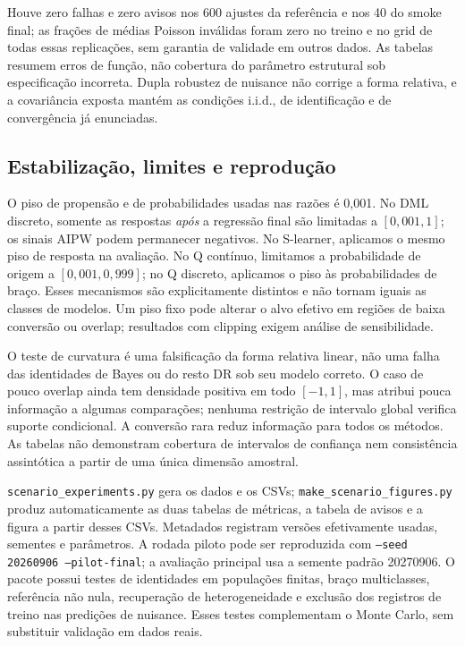 Houve zero falhas e zero avisos nos 600 ajustes da referência e nos 40 do smoke final; as frações de médias Poisson inválidas foram zero no treino e no grid de todas essas replicações, sem garantia de validade em outros dados. As tabelas resumem erros de função, não cobertura do parâmetro estrutural sob especificação incorreta. Dupla robustez de nuisance não corrige a forma relativa, e a covariância exposta mantém as condições i.i.d., de identificação e de convergência já enunciadas.

\subsection{Estabilização, limites e reprodução}
O piso de propensão e de probabilidades usadas nas razões é 0,001. No DML discreto, somente as respostas \emph{após} a regressão final são limitadas a $[0{,}001,1]$; os sinais AIPW podem permanecer negativos. No S-learner, aplicamos o mesmo piso de resposta na avaliação. No Q contínuo, limitamos a probabilidade de origem a $[0{,}001,0{,}999]$; no Q discreto, aplicamos o piso às probabilidades de braço. Esses mecanismos são explicitamente distintos e não tornam iguais as classes de modelos. Um piso fixo pode alterar o alvo efetivo em regiões de baixa conversão ou overlap; resultados com clipping exigem análise de sensibilidade.

\begin{table}[htbp]
\centering
\caption{Replicações com ao menos um aviso de clipping, por cenário e método, na avaliação principal. O numerador conta ajustes, não indivíduos.}
\label{tab:scenarios-clipping}
\small

\end{table}

O teste de curvatura é uma falsificação da forma relativa linear, não uma falha das identidades de Bayes ou do resto DR sob seu modelo correto. O caso de pouco overlap ainda tem densidade positiva em todo $[-1,1]$, mas atribui pouca informação a algumas comparações; nenhuma restrição de intervalo global verifica suporte condicional. A conversão rara reduz informação para todos os métodos. As tabelas não demonstram cobertura de intervalos de confiança nem consistência assintótica a partir de uma única dimensão amostral.

\texttt{scenario\_experiments.py} gera os dados e os CSVs; \texttt{make\_scenario\_figures.py} produz automaticamente as duas tabelas de métricas, a tabela de avisos e a figura a partir desses CSVs. Metadados registram versões efetivamente usadas, sementes e parâmetros. A rodada piloto pode ser reproduzida com \texttt{--seed 20260906 --pilot-final}; a avaliação principal usa a semente padrão 20270906. O pacote possui testes de identidades em populações finitas, braço multiclasses, referência não nula, recuperação de heterogeneidade e exclusão dos registros de treino nas predições de nuisance. Esses testes complementam o Monte Carlo, sem substituir validação em dados reais.
